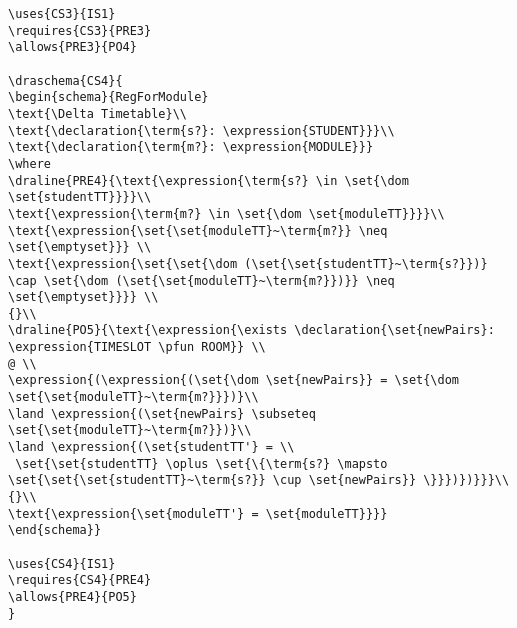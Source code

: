 \begin{verbatim}
\uses{CS3}{IS1}
\requires{CS3}{PRE3}
\allows{PRE3}{PO4}

\draschema{CS4}{
\begin{schema}{RegForModule}
\text{\Delta Timetable}\\
\text{\declaration{\term{s?}: \expression{STUDENT}}}\\
\text{\declaration{\term{m?}: \expression{MODULE}}}
\where
\draline{PRE4}{\text{\expression{\term{s?} \in \set{\dom \set{studentTT}}}}\\
\text{\expression{\term{m?} \in \set{\dom \set{moduleTT}}}}\\
\text{\expression{\set{\set{moduleTT}~\term{m?}} \neq \set{\emptyset}}} \\
\text{\expression{\set{\set{\dom (\set{\set{studentTT}~\term{s?}})} \cap \set{\dom (\set{\set{moduleTT}~\term{m?}})}} \neq \set{\emptyset}}}} \\
{}\\
\draline{PO5}{\text{\expression{\exists \declaration{\set{newPairs}: \expression{TIMESLOT \pfun ROOM}} \\
@ \\
\expression{(\expression{(\set{\dom \set{newPairs}} = \set{\dom \set{\set{moduleTT}~\term{m?}}})}\\
\land \expression{(\set{newPairs} \subseteq \set{\set{moduleTT}~\term{m?}})}\\
\land \expression{(\set{studentTT'} = \\
 \set{\set{studentTT} \oplus \set{\{\term{s?} \mapsto \set{\set{\set{studentTT}~\term{s?}} \cup \set{newPairs}} \}}})})}}}\\
{}\\
\text{\expression{\set{moduleTT'} = \set{moduleTT}}}}
\end{schema}}

\uses{CS4}{IS1}
\requires{CS4}{PRE4}
\allows{PRE4}{PO5}
}

\end{verbatim}
